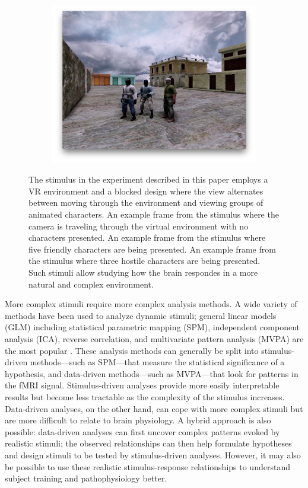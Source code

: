 \documentclass[5p,authoryear]{elsarticle}
\begin{document}
\begin{figure}
\begin{subfigure}{0.3\textwidth}
\includegraphics[width=\textwidth]{figures/stimulus-three-insurgents}
\caption{}
\label{fig:stimulus-three-insurgents}
\end{subfigure}
\caption{
The stimulus in the experiment described in this paper employs a VR environment and a blocked design where the view alternates between moving through the environment and viewing groups of animated characters.
 An example frame from the stimulus where the camera is traveling through the virtual environment with no characters presented.
 An example frame from the stimulus where five friendly characters are being presented.
 An example frame from the stimulus where three hostile characters are being presented.
Such stimuli allow studying how the brain respondes in a more natural and complex environment.
}
\label{fig:stimulus}
\end{figure}

More complex stimuli require more complex analysis methods.
A wide variety of methods have been used to analyze dynamic stimuli; general linear models (GLM) including statistical parametric mapping (SPM), independent component analysis (ICA), reverse correlation, and multivariate pattern analysis (MVPA) are the most popular \citep{Spiers2007}.
These analysis methods can generally be split into stimulus-driven methods---such as SPM---that measure the statistical significance of a hypothesis, and data-driven methods---such as MVPA---that look for patterns in the fMRI signal.
Stimulus-driven analyses provide more easily interpretable results but become less tractable as the complexity of the stimulus increases.
Data-driven analyses, on the other hand, can cope with more complex stimuli but are more difficult to relate to brain physiology.
A hybrid approach is also possible: data-driven analyses can first uncover complex patterns evoked by realistic stimuli; the observed relationships can then help formulate hypotheses and design stimuli to be tested by stimulus-driven analyses. 
However, it may also be possible to use these realistic stimulus-response relationships to understand subject training and pathophysiology better.
\end{document}
